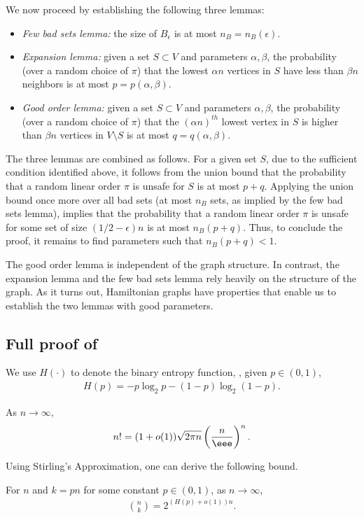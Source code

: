 We now proceed by establishing the following three lemmas:
\begin{itemize}
	\item \emph{Few bad sets lemma:} the size of $B_\epsilon$ is at most $n_B=n_B(\epsilon)$.
	\item \emph{Expansion lemma:}
	given a set $S \subset V$ and parameters $\alpha, \beta$, the probability (over a random choice of $\pi$) that the lowest $\alpha n$ vertices in $S$ have less than $\beta n$ neighbors is at most $p=p(\alpha,\beta)$.
	\item \emph{Good order lemma:} given a set $S \subset V$ and parameters $\alpha, \beta$, the probability (over a random choice of $\pi$) that the $(\alpha n)^{th}$ lowest vertex in $S$ is higher than $\beta n$ vertices in $V \setminus S$ is at most $q=q(\alpha,\beta)$.
\end{itemize}

The three lemmas are combined as follows.
For a given set $S$, due to the sufficient condition identified above, it follows from the union bound that the probability that a
%
random linear order $\pi$ is unsafe for $S$ is at most $p+q$.
Applying the union bound once more over all bad sets (at most $n_B$ sets, as implied by the few bad sets lemma), implies that the probability that a
%
random linear order $\pi$ is unsafe for some set of size $(1/2-\epsilon)n$ is at most $n_B(p+q)$.
Thus, to conclude the proof, it remains to find parameters such that $n_B(p+q) < 1$.

The good order lemma is independent of the graph structure.
In contrast, the expansion lemma and the few bad sets lemma rely heavily on the structure of the graph.
As it turns out, Hamiltonian graphs have properties that enable us to establish the two lemmas with good parameters.


\subsection{Full proof of }\label{sec:app-hamiltonian}


We use $H(\cdot)$ to denote the binary entropy function, %
\ie, given $p\in (0,1)$, \begin{eqnarray}H(p)=-p\log_2 p-(1-p)\log_2(1-p).
\end{eqnarray}

\begin{fact}
	As $n\rightarrow\infty$, 
\begin{eqnarray}n!=(1+o(1))\sqrt{2\pi n}\left(\frac{n}{\eee}\right)^n.
		\end{eqnarray}
\end{fact}
Using Stirling's Approximation, one can derive the following bound.
\begin{fact}\label{fact:binom_estimate}
  For $n$ and $k=pn$ for some
constant %
%
$p\in (0,1)$, as $n\rightarrow\infty$,
	\begin{eqnarray}
	\binom{n}{k}=2^{(H(p)+o(1))n}.\label{eq:binom_approx}
	\end{eqnarray}
\end{fact}

